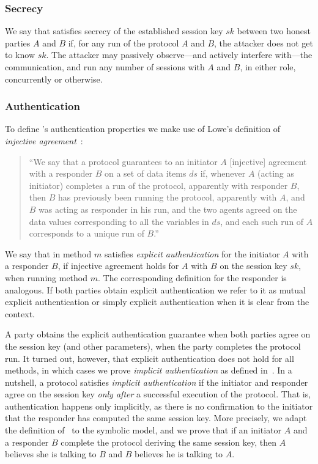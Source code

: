 \spacehack
\subsubsection{Secrecy}
We say that \mEdhoc{} satisfies secrecy of the established session key $sk$
between two honest parties $A$ and $B$ if, for any run of the protocol $A$ and
$B$, the attacker does not get to know $sk$.
%
The attacker may passively observe---and actively interfere with---the
communication, and run any number of sessions with $A$ and $B$, in either role,
concurrently or otherwise.

\spacehack
\subsubsection{Authentication}
To define \mEdhoc{}'s authentication properties we make use of Lowe's definition
of \emph{injective agreement}~\cite{DBLP:conf/csfw/Lowe97a}:
\begin{quote}
  ``We say that a protocol guarantees to an initiator $A$ [injective] agreement
  with a responder $B$ on a set of data items $ds$ if, whenever $A$ (acting as
  initiator) completes a run of the protocol, apparently with responder $B$,
  then $B$ has previously been running the protocol, apparently with $A$, and
  $B$ was acting as responder in his run, and the two agents agreed on the data
  values corresponding to all the variables in $ds$, and each such run of $A$
  corresponds to a unique run of $B$.''
\end{quote}
%
We say that \mEdhoc{} in method $m$ satisfies \emph{explicit authentication} for
the initiator $A$ with a responder $B$, if injective agreement holds for $A$
with $B$ on the session key $sk$, when running method $m$.
%
The corresponding definition for the responder is analogous.
%
If both parties obtain explicit authentication we refer to it as mutual explicit
authentication or simply explicit authentication when it is clear from the
context.

A party obtains the explicit authentication guarantee when both parties agree
on the session key (and other parameters), when the party completes the protocol
run.
%
It turned out, however, that explicit authentication does not hold for all
\mEdhoc{} methods, in which cases we prove \emph{implicit authentication} as
defined in~\cite{DBLP:journals/iacr/GuilhemFW19}.
%
In a nutshell, a protocol satisfies \emph{implicit authentication} if the
initiator and responder agree on the session key \emph{only after} a successful
execution of the protocol.
%
That is, authentication happens only implicitly, as there is no confirmation to
the initiator that the responder has computed the same session key.
%
More precisely, we adapt the definition of~\cite{DBLP:journals/iacr/GuilhemFW19}
to the symbolic model, and we prove that if an initiator $A$ and a responder $B$
complete the protocol deriving the same session key, then $A$ believes she is
talking to $B$ and $B$ believes he is talking to $A$.


